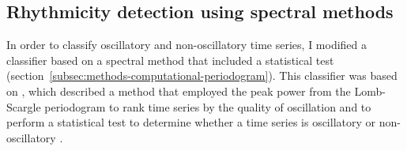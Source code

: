\subsection{Rhythmicity detection using spectral methods}
\label{subsec:analysis-classification-spectral}

In order to classify oscillatory and non-oscillatory time series, I modified a classifier based on a spectral method that included a statistical test (section~\ref{subsec:methods-computational-periodogram}).
This classifier was based on \textcite{glynnDetectingPeriodicPatterns2006a}, which described a method that employed the peak power from the Lomb-Scargle periodogram \parencite{lombLeastsquaresFrequencyAnalysis1976} to rank time series by the quality of oscillation and to perform a statistical test to determine whether a time series is oscillatory or non-oscillatory \parencite{scargleStudiesAstronomicalTime1982}.

